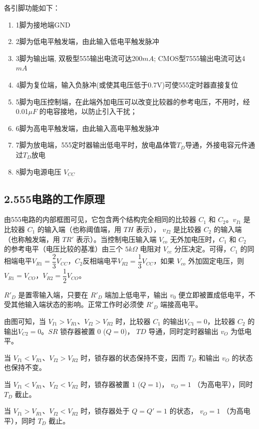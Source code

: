 \documentclass{ctexart}
\begin{document}
各引脚功能如下：
\begin{enumerate}[(1)]
    \item 1脚为接地端GND
    \item 2脚为低电平触发端，由此输入低电平触发脉冲
    \item 3脚为输出端, 双极型555输出电流可达200$mA$; CMOS型7555输出电流可达4$mA$
    \item 4脚为复位端，输入负脉冲(或使其电压低于0.7V)可使555定时器直接复位
    \item 5脚为电压控制端，在此端外加电压可以改变比较器的参考电压，不用时，经0.01$\mu F$ 的电容接地，以防止引入干扰；
    \item 6脚为高电平触发端，由此输入高电平触发脉冲
    \item 7脚为放电端，555定时器输出低电平时，放电晶体管$T_D$导通，外接电容元件通过$T_D$放电\item 8脚为电源电压 $V_{CC}$
\end{enumerate}

\subsection*{2.555电路的工作原理}

由555电路的内部框图可见，它包含两个结构完全相同的比较器 $C_1$ 和 $C_2$。$v_{I1}$ 是比较器 $C_1$ 的输入端（也称阈值端，用 $TH$ 表示）， $v_{I2}$ 是比较器 $C_2$ 的输入端（也称触发端，用 $TR'$ 表示）。当控制电压输入端 $V_{co}$ 无外加电压时，$C_1$ 和 $C_2$ 的参考电平（电压比较的基准）由三个 $5k\Omega$ 电阻对 $V_{cc}$ 分压决定。可得，$C_1$ 的同相端电平$V_{R1}=\dfrac{2}{3}V_{CC}$，$C_2$反相端电平$V_{R2}=\dfrac{1}{3}V_{CC}$，如果 $V_{co}$ 外加固定电压，则$V_{R1}=V_{CO}$，$V_{R2}=\dfrac{1}{2}V_{CO}$。

$R'_D$ 是置零输入端，只要在 $R'_D$ 端加上低电平，输出 $v_0$ 便立即被置成低电平，不受其他输入端状态的影响。正常工作时必须使 $R'_D$ 端接高电平。

由图可知，当 $V_{I1}>V_{R1}$、$V_{I2}>V_{R2}$ 时，比较器 $C_1$ 的输出$V_{C1}=0$，比较器 $C_2$ 的输出$V_{C2}=0$。$SR$ 锁存器被置 $0$ ($Q=0$)， $TD$ 导通，同时定时器输出 $v_O$ 为低电平。

当 $V_{I1}<V_{R1}$、$V_{I2}>V_{R2}$ 时，锁存器的状态保持不变，因而 $T_D$ 和输出 $v_O$ 的状态也保持不变。

当 $V_{I1}<V_{R1}$、$V_{I2}<V_{R2}$ 时，锁存器被置 $1$ ($Q=1$)， $v_O=1$ （为高电平），同时 $T_D$ 截止。

当 $V_{I1}>V_{R1}$、$V_{I2}<V_{R2}$ 时，锁存器处于 $Q=Q'=1$ 的状态， $v_O=1$ （为高电平），同时 $T_D$ 截止。
\end{document}
